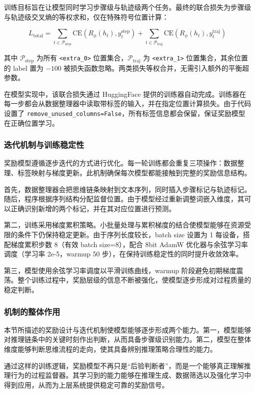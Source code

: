 \documentclass[professional,privacy,print,win,long,STEM,AutoFakeBold]{def/buaa}
\begin{document}
训练目标旨在让模型同时学习步骤级与轨迹级两个任务。最终的联合损失为步骤级与轨迹级交叉熵的等权求和，仅在特殊符号位置计算：

\[
L_{\text{total}} = \sum_{t \in \mathcal{P}_{\text{step}}} \text{CE}(R_\phi(h_t), y_t^{\text{step}}) + \sum_{t \in \mathcal{P}_{\text{traj}}} \text{CE}(R_\phi(h_t), y_t^{\text{traj}})
\]

其中 $\mathcal{P}_{\text{step}}$ 为所有 \texttt{<extra\_0>} 位置集合，$\mathcal{P}_{\text{traj}}$ 为 \texttt{<extra\_1>} 位置集合，其余位置的 label 置为 $-100$ 被损失函数忽略。两类损失等权合并，无需引入额外的平衡超参数。

在模型实现中，该联合损失通过 HuggingFace 提供的训练器自动完成。训练器在每一步都会从数据整理器中读取带标签的输入，并在指定位置计算损失。由于代码设置了 \verb|remove_unused_columns=False|，所有标签信息都会保留，保证奖励模型在正确位置学习。

\subsubsection{迭代机制与训练稳定性}

奖励模型遵循逐步迭代的方式进行优化。每一轮训练都会重复三项操作：数据整理、标签映射与梯度更新。此机制确保每次模型都能接触到完整的奖励信息结构。

首先，数据整理器会把思维链条映射到文本序列，同时插入步骤标记与轨迹标记。随后，程序根据序列结构分配监督位置。由于模型经过重新调整词嵌入维度，其可以正确识别新增的两个标记，并在其对应位置进行预测。

第二，训练采用梯度累积策略。小批量处理与累积梯度的结合使模型能够在资源受限的条件下仍保持稳定更新。由于序列长度较长，batch size 设置为 1 每设备，搭配梯度累积步数 8（有效 batch size=8），配合 8bit AdamW 优化器与余弦学习率调度（学习率 2e-5，warmup 50 步），在保持训练稳定性的同时提升收敛效率。

第三，模型使用余弦学习率调度以平滑训练曲线，warmup 阶段避免初期梯度震荡。整个训练过程中，奖励层级的信息不断被强化，使模型逐步形成对过程质量的稳定判断。

\subsubsection{机制的整体作用}

本节所描述的奖励设计与迭代机制使模型能够逐步形成两个能力。第一，模型能够对推理链条中的关键时刻作出判断，从而具备步骤级识别能力。第二，模型在整体维度能够判断思维流程的走向，使其具备辨别推理策略合理性的能力。

通过这样的训练逻辑，奖励模型不再只是“后验判断者”，而是一个能够真正理解推理行为的过程监督器。其学习到的能力能够在推理生成、数据筛选以及强化学习中得到应用，从而为上层系统提供稳定可靠的奖励信号。
\end{document}
